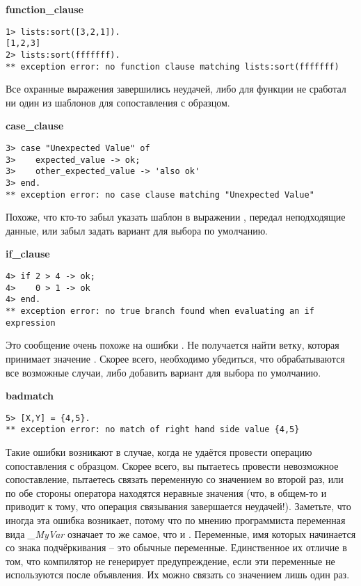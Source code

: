 \textbf{function\_clause}
\begin{lstlisting}[style=erlang]
1> lists:sort([3,2,1]).
[1,2,3]
2> lists:sort(fffffff).
** exception error: no function clause matching lists:sort(fffffff)
\end{lstlisting}

Все охранные выражения завершились неудачей, либо для функции не сработал ни один из шаблонов для сопоставления с образцом.
\blankline

\textbf{case\_clause}
\begin{lstlisting}[style=erlang]
3> case "Unexpected Value" of
3>    expected_value -> ok;
3>    other_expected_value -> 'also ok'
3> end.
** exception error: no case clause matching "Unexpected Value"
\end{lstlisting}

Похоже, что кто\--то забыл указать шаблон в выражении , передал неподходящие данные, или забыл задать вариант для выбора по умолчанию.
\blankline

\textbf{if\_clause}
\begin{lstlisting}[style=erlang]
4> if 2 > 4 -> ok;
4>    0 > 1 -> ok
4> end.
** exception error: no true branch found when evaluating an if expression
\end{lstlisting}

Это сообщение очень похоже на ошибки . Не получается найти ветку, которая принимает значение .
Скорее всего, необходимо убедиться, что обрабатываются все возможные случаи, либо добавить вариант  для выбора по умолчанию.
\blankline

\textbf{badmatch}
\begin{lstlisting}[style=erlang]
5> [X,Y] = {4,5}.
** exception error: no match of right hand side value {4,5}
\end{lstlisting}

Такие ошибки возникают в случае, когда не удаётся провести операцию сопоставления с образцом.
Скорее всего, вы пытаетесь провести невозможное сопоставление, пытаетесь связать переменную со значением во второй раз, или по обе стороны оператора \ops{\strut=} находятся неравные значения (что, в общем\--то и приводит к тому, что операция связывания завершается неудачей!).
Заметьте, что иногда эта ошибка возникает, потому что по мнению программиста переменная вида \emph{\_MyVar} означает то же самое, что и \ops{\strut\_}.
Переменные, имя которых начинается со знака подчёркивания \--- это обычные переменные.
Единственное их отличие в том, что компилятор не генерирует предупреждение, если эти переменные не используются после объявления.
Их можно связать со значением лишь один раз.
\blankline

